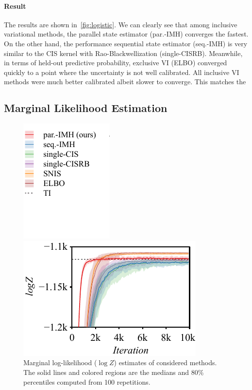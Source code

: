 \paragraph{Result}
The results are shown in~\cref{fig:logistic}.
We can clearly see that among inclusive variational methods, the parallel state estimator (par.-IMH) converges the fastest.
On the other hand, the performance sequential state estimator (seq.-IMH) is very similar to the CIS kernel with Rao-Blackwellization (single-CISRB).
Meanwhile, in terms of held-out predictive probability, exclusive VI (ELBO) converged quickly to a point where the uncertainty is not well calibrated.
All inclusive VI methods were much better calibrated albeit slower to converge.
This matches the 

\subsection{Marginal Likelihood Estimation}\label{section:mll}
%
\begin{figure}[H]
  \centering
  \begin{minipage}[b]{0.3\linewidth}
    \centering
    \includegraphics[scale=0.8]{figures/radon_03.pdf}
  \end{minipage}
  \begin{minipage}[b]{0.6\linewidth}
    \centering
    \includegraphics[scale=0.8]{figures/radon_02.pdf}
  \end{minipage}
  \caption{Marginal log-likelihood (\(\log Z\)) estimates of considered methods.
    The solid lines and colored regions are the medians and 80\% percentiles computed from 100 repetitions.
  }\label{fig:marginal_likelihood}
\end{figure}
%
